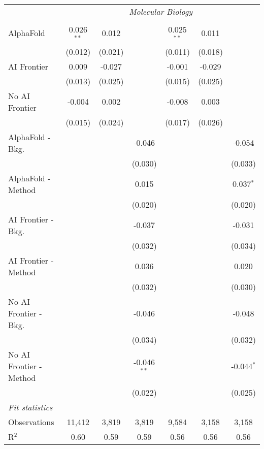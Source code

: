 \begin{tabular}{lcccccc}
 & \multicolumn{6}{c}{\textit{Molecular Biology}} \\ \\
   AlphaFold               & 0.026$^{**}$ & 0.012   &               & 0.025$^{**}$ & 0.011   &   \\   
                           & (0.012)      & (0.021) &               & (0.011)      & (0.018) &   \\   
   AI Frontier             & 0.009        & -0.027  &               & -0.001       & -0.029  &   \\   
                           & (0.013)      & (0.025) &               & (0.015)      & (0.025) &   \\   
   No AI Frontier          & -0.004       & 0.002   &               & -0.008       & 0.003   &   \\   
                           & (0.015)      & (0.024) &               & (0.017)      & (0.026) &   \\   
   AlphaFold - Bkg.        &              &         & -0.046        &              &         & -0.054\\   
                           &              &         & (0.030)       &              &         & (0.033)\\   
   AlphaFold - Method      &              &         & 0.015         &              &         & 0.037$^{*}$\\   
                           &              &         & (0.020)       &              &         & (0.020)\\   
   AI Frontier - Bkg.      &              &         & -0.037        &              &         & -0.031\\   
                           &              &         & (0.032)       &              &         & (0.034)\\   
   AI Frontier - Method    &              &         & 0.036         &              &         & 0.020\\   
                           &              &         & (0.032)       &              &         & (0.030)\\   
   No AI Frontier - Bkg.   &              &         & -0.046        &              &         & -0.048\\   
                           &              &         & (0.034)       &              &         & (0.032)\\   
   No AI Frontier - Method &              &         & -0.046$^{**}$ &              &         & -0.044$^{*}$\\   
                           &              &         & (0.022)       &              &         & (0.025)\\   
   \midrule
   \emph{Fit statistics}\\
   Observations            & 11,412       & 3,819   & 3,819         & 9,584        & 3,158   & 3,158\\  
   R$^2$                   & 0.60         & 0.59    & 0.59          & 0.56         & 0.56    & 0.56\\  
   

\end{tabular}
